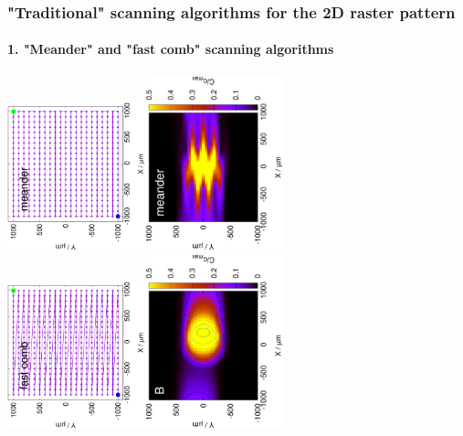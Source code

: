 \documentclass{beamer}
\begin{document}
\begin{frame}
	\frametitle{"Traditional" scanning algorithms for the 2D raster pattern}
	\framesubtitle{1. "Meander" and "fast comb" scanning algorithms}
	\includegraphics[width=0.3\textwidth, angle=-90]{meander_pattern.eps}\includegraphics[width=0.3\textwidth, angle=-90]{meander_sim.eps}\\
		\includegraphics[width=0.3\textwidth, angle=-90]{fastcomb_pattern.eps}\includegraphics[width=0.3\textwidth, angle=-90]{fastcomb_sim.eps}
	\vfill
\end{frame}
\end{document}
